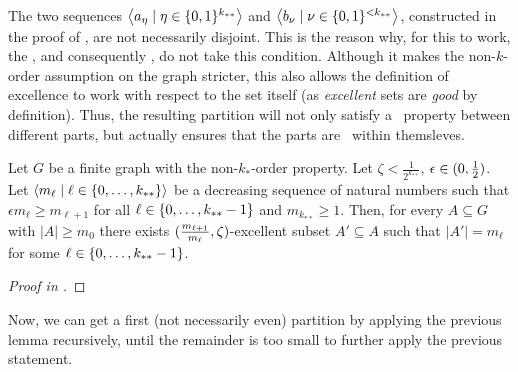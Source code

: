         \begin{remark}
            The two sequences $\left< a_\eta \mid \eta \in \{ 0,1 \}^{k_{**}} \right>$ and $\left< b_\nu \mid \nu \in \{ 0,1 \}^{<k_{**}} \right>$,
            constructed in the proof of , are not necessarily disjoint.
            This is the reason why, for this to work, the , and consequently ,
            do not take this condition.
            Although it makes the non-$k$-order assumption on the graph stricter, this also allows the definition of excellence
            to work with respect to the set itself (as \emph{excellent} sets are \emph{good} by definition).
            Thus, the resulting partition will not only satisfy a \regular~property between different parts, but actually ensures
            that the parts are \regular~within themsleves.
        \end{remark}

        \begin{lemma} \label{lem:existance_of_excellent_subsets_fixed_size_choices}
            Let $G$ be a finite graph with the non-$k_{*}$-order property.
            Let $\zeta < \frac{1}{2^{k_{**}}}$, $\epsilon \in ( 0, \frac{1}{2} )$.
            Let $\left< m_\ell \mid \ell \in \{ 0, \dots, k_{**} \} \right>$ be a decreasing sequence of natural numbers such that
            $\epsilon m_{\ell} \geq m_{\ell+1}$ for all $\ell \in \{ 0, \dots, k_{**}-1 \}$ and $m_{k_{**}} \geq 1$.
            Then, for every $A \subseteq G$ with $|A| \geq m_0$ there exists
            $( \frac{m_{\ell+1}}{m_{\ell}}, \zeta )$-excellent subset $A' \subseteq A$ such that $|A'| = m_\ell$ for
            some $\ell \in \{ 0, \dots, k_{**}-1 \}$.
            \begin{proof} [Proof in ]
            \end{proof}
        \end{lemma}

        Now, we can get a first (not necessarily even) partition by applying the previous lemma recursively,
        until the remainder is too small to further apply the previous statement.

